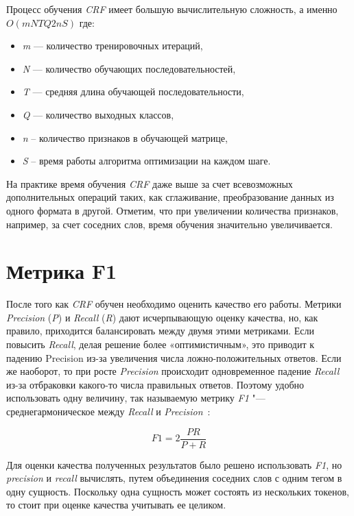 \documentclass{csmathnotes}
\begin{document}
Процесс обучения \emph{CRF} имеет большую вычислительную сложность, а именно $O(mNTQ2nS)$ где:
\begin{itemize}
    \item \emph{m} — количество тренировочных итераций,
    \item \emph{N} — количество обучающих последовательностей,
    \item \emph{T} — средняя длина обучающей последовательности,
    \item \emph{Q} — количество выходных классов,
    \item \emph{n} – количество признаков в обучающей матрице,
    \item \emph{S} – время работы алгоритма оптимизации на каждом шаге. 
\end{itemize}


На практике время обучения \emph{CRF} даже выше за счет всевозможных дополнительных операций таких, как сглаживание, преобразование данных из одного формата в другой.
Отметим, что при увеличении количества признаков, например, за счет соседних слов, время обучения значительно увеличивается. 

\section*{Метрика F1}
После того как \emph{CRF} обучен необходимо оценить качество его работы. 
Метрики \emph{Precision} (\emph{P}) и \emph{Recall} (\emph{R}) дают исчерпывающую оценку качества, но, как правило, приходится балансировать между двумя этими метриками.
Если повысить \emph{Recall}, делая решение более «оптимистичным», это приводит к падению Precision из-за увеличения числа ложно-положительных ответов.
Если же наоборот, то при росте \emph{Precision} происходит одновременное падение \emph{Recall} из-за отбраковки какого-то числа правильных ответов.
Поэтому удобно использовать одну величину, так называемую метрику \emph{F1} "--- среднегармоническое между \emph{Recall} и \emph{Precision}~\cite{F1}:

\begin{equation}
F1 = 2\frac{P R}{P + R} 
\end{equation}

Для оценки качества полученных результатов было решено использовать \emph{F1}, но \emph{precision} и \emph{recall} вычислять, путем объединения соседних слов с одним тегом в одну сущность.
Поскольку одна сущность может состоять из нескольких токенов, то стоит при оценке качества учитывать ее целиком. 
\end{document}
